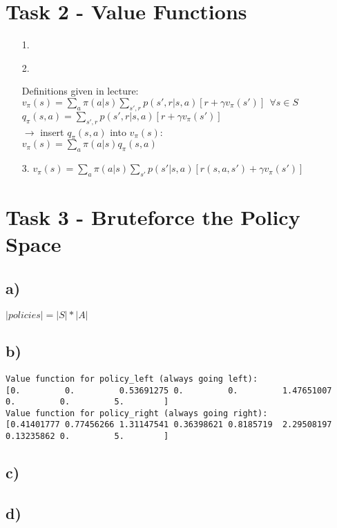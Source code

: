 \documentclass[a4paper]{article}
\begin{document}
\section*{Task 2 - Value Functions}

\begin{enumerate}
	\item[1.]
	
	\item[2.]
	
	Definitions given in lecture: \\
	$v_\pi (s) = \sum_{a}\pi (a|s) \sum_{s',r}p(s',r|s,a)[r+ \gamma v_\pi (s')] \ \ \forall s \in S$ \\
	$q_\pi (s,a) = \sum_{s',r}p(s',r|s,a)[r+\gamma v_\pi (s')]$ \\
	$\rightarrow $ insert $q_\pi (s,a)$ into $v_\pi (s)$: \\ 
	$v_\pi (s) = \sum_{a}\pi (a|s) q_\pi (s,a)$
	\item[3.]
	$v_\pi (s) = \sum_{a}\pi (a|s) \sum_{s'}p(s'|s,a)[r(s,a,s')+ \gamma v_\pi (s')]$ \\
\end{enumerate}

\section*{Task 3 - Bruteforce the Policy Space}
\subsection*{a)}
$ |policies|  =  |S| * |A| $
\subsection*{b)}

\begin{lstlisting}
Value function for policy_left (always going left):
[0.         0.         0.53691275 0.         0.         1.47651007
0.         0.         5.        ]
Value function for policy_right (always going right):
[0.41401777 0.77456266 1.31147541 0.36398621 0.8185719  2.29508197
0.13235862 0.         5.        ]
\end{lstlisting}

\subsection*{c)}


\subsection*{d)}
\end{document}
